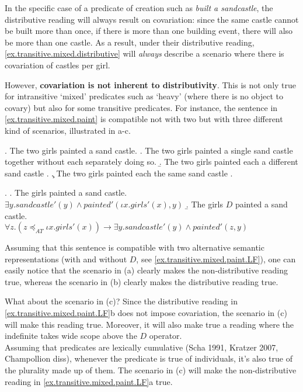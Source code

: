 In the specific case of a predicate of creation such as \textit{built a sandcastle}, the distributive reading will always result on covariation: since the same castle cannot be built more than once, if there is more than one building event, there will also be more than one castle. As a result, under their distributive reading, \ref{ex.transitive.mixed.distributive} will \emph{always} describe a scenario where there is covariation of castles per girl. 

However, \textbf{covariation is not inherent to distributivity}. This is not only true for intransitive `mixed' predicates such as `heavy' (where there is no object to covary) but also for some transitive predicates. For instance, the sentence in \ref{ex.transitive.mixed.paint} is compatible not with two but with three different kind of scenarios, illustrated in a-c. 

\ex. The two girls painted a sand castle. \label{ex.transitive.mixed.paint}
\a. The two girls painted a single sand castle together without each separately doing so. 
\b.  The two girls painted each a different sand castle .
\c. The two girls painted each the same sand castle .

\ex. \label{ex.transitive.mixed.paint.LF}
\a. The girls painted a sand castle.\\
        $\exists y.\mathit{sandcastle}'(y) \wedge \textit{painted}'(\iota x.\mathit{girls}'(x), y)$
\b. The girls $D$ painted a sand castle.\\
    $\forall z . (z\preceq_{AT} \iota x.\mathit{girls}'(x)) \rightarrow \exists y.\mathit{sand castle}'(y) \wedge \textit{painted}'(z,y)$
    

Assuming that this sentence is compatible with two alternative semantic representations 
(with and without $D$, see \ref{ex.transitive.mixed.paint.LF}), one can easily notice that the scenario in (a) clearly makes the non-distributive reading true, whereas the scenario in (b) clearly makes the distributive reading true.

What about the scenario in (c)? 
Since the distributive reading in \ref{ex.transitive.mixed.paint.LF}b does not impose covariation, the scenario in (c) will make this reading true. Moreover, it will also make true a reading where the indefinite takes wide scope above the $D$ operator. 
 \\  
Assuming that predicates are lexically cumulative (Scha 1991, Kratzer 2007, Champollion diss), whenever the predicate is true of individuals, it's also true of the plurality made up of them. The scenario in (c) will make the non-distributive reading in \ref{ex.transitive.mixed.paint.LF}a true.




